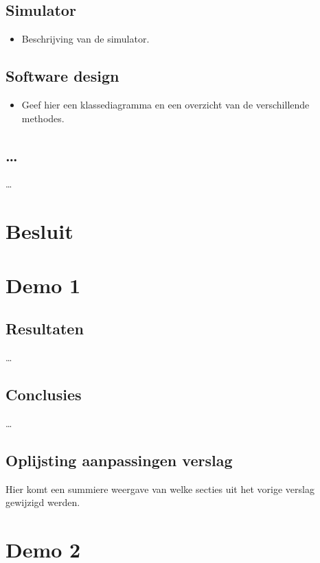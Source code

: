 \documentclass[tt1]{penoverslag}
\begin{document}
\subsection{Simulator}
\begin{itemize}
\item Beschrijving van de simulator.
\end{itemize}

\subsection{Software design}
\begin{itemize}
\item Geef hier een klassediagramma en een overzicht van de verschillende methodes.
\end{itemize}

\subsection{\ldots}
\ldots


\section{Besluit}
\lipsum[6-7]



\newpage
\makeappendix

\section{Demo 1}

\subsection{Resultaten}
\ldots

\subsection{Conclusies}
\ldots

\subsection{Oplijsting aanpassingen verslag}
Hier komt een summiere weergave van welke secties uit het vorige verslag gewijzigd werden.


\section{Demo 2}
\end{document}
